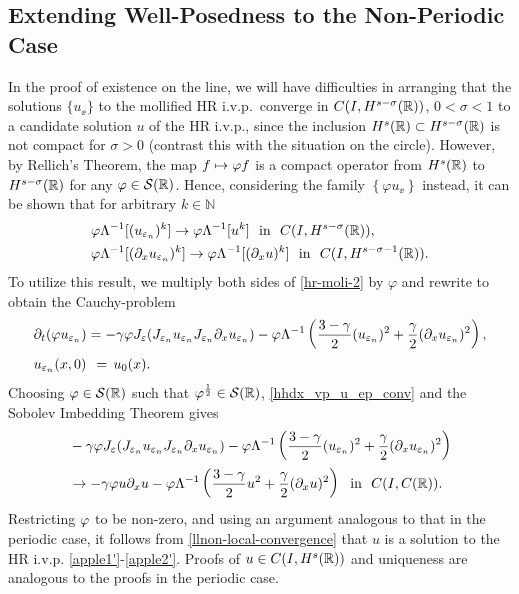 \subsection{Extending Well-Posedness to the Non-Periodic Case}
In the proof of existence on the line, we will have difficulties in 
arranging
that the solutions $\{u_\ee\}$ to the mollified HR i.v.p.\ converge in $C(I,
H^{s- \sigma}(\mathbb{R}))$, $0 < \sigma < 1$ to a candidate solution $u$ of the 
HR i.v.p., since the inclusion $H^s(\mathbb{R}) \subset H^{s-\sigma}(\mathbb{R})$ is not 
compact for $\sigma > 0$ (contrast this with the situation on the circle).  
However, by Rellich's Theorem, the map $f \mapsto \varphi f$
is a compact operator from $H^s(\mathbb{R})$ to  $H^{s-\sigma}(\mathbb{R})$ for any $\varphi 
\in \mathcal{S}(\mathbb{R})$.
Hence, considering the family $\left\{ \varphi
u_\ee \right\}$ instead, it can be shown that 
for arbitrary $k \in \mathbb{N}$
%
%
\begin{equation}
\begin{split}
& \vp \Lambda^{-1} [(u_{\ee_n})^k] \to \vp \Lambda^{-1} [u^k] \ \ \text{in}  \ \ C(I,
H^{s-\sigma }(\rr)),
\\
& \vp \Lambda^{-1} [(\p_x u_{\ee_n})^k] \to \vp \Lambda^{-1} [(\p_x u)^k] \ \
\text{in}  \ \ C(I,
H^{s-\sigma -1}(\rr)).
\label{hhdx_vp_u_ep_conv}
\end{split}
\end{equation}
%
%
%
%
To utilize this result, we multiply both sides of \eqref{hr-moli-2} by 
$\varphi$ and rewrite to obtain the Cauchy-problem
%
%
\begin{align}
 & \partial_t(\varphi u_{\varepsilon_n} )  = -\gamma \varphi J_\varepsilon (J_{\varepsilon_n} u_{\varepsilon_n} 
J_{\varepsilon_n} \partial_x u_{\varepsilon_n}) - \varphi \Lambda^{-1} \left( \frac{3-\gamma}{2} 
(u_{\varepsilon_n})^2
+ \frac{\gamma}{2} (\partial_x u_{\varepsilon_n})^2 \right ),
\\
& u_{\varepsilon_n}(x, 0) \phantom{\,,} = \phantom{\,} u_0 (x).
\label{real-line-moli-data-2} 
\end{align}
%
%
Choosing $\varphi \in \mathcal{S}(\mathbb{R})$ such that
$\varphi^\frac{1}{2} \in \mathcal{S}(\mathbb{R})$, \eqref{hhdx_vp_u_ep_conv} and the 
Sobolev Imbedding Theorem
gives 
%
%
%
\begin{equation}
\begin{split}
	& -\gamma \varphi J_\varepsilon (J_{\varepsilon_n} u_{\varepsilon_n} 
J_{\varepsilon_n} \partial_x u_{\varepsilon_n}) - \varphi \Lambda^{-1} \left( \frac{3-\gamma}{2}
(u_{\varepsilon_n})^2
+ \frac{\gamma}{2} (\partial_x u_{\varepsilon_n})^2 \right )
\\
& \to -\gamma \varphi u \partial_x u - \varphi \Lambda^{-1} \left( \frac{3-\gamma}{2} u^2
+ \frac{\gamma}{2} (\partial_x u)^2 \right ) \ \
\text{in} \ \ C(I, C(\mathbb{R})).
\label{llnon-local-convergence}
\end{split}
\end{equation}
%
%
%
Restricting $\varphi$ to be non-zero, and using an argument analogous to that in the periodic case, it follows from 
\eqref{llnon-local-convergence} that $u$ is a solution to the HR i.v.p.
\eqref{apple1'}-\eqref{apple2'}. Proofs of 
$u \in C(I, H^s(\mathbb{R}))$ and uniqueness are analogous to the proofs in 
the periodic case.
%
%

